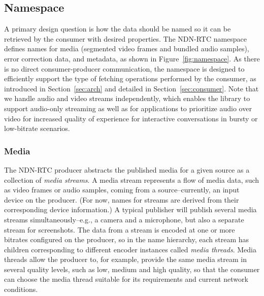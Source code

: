 \documentclass{icn/sig-alternate-2013} %
\newcommand{\ndnrtcName}{NDN-RTC} %
\begin{document}
\subsection{Namespace}

A primary design question is how the data should be named so it can be retrieved by the consumer with desired properties. The \ndnrtcName{} namespace defines names for media (segmented video frames and bundled audio samples), error correction data, and metadata, as shown in Figure~\ref{fig:namespace}.  As there is no direct consumer-producer communication, the namespace is designed to efficiently support the type of fetching operations performed by the consumer, as introduced in Section~\ref{sec:arch} and detailed in Section~\ref{sec:consumer}.   Note that we handle audio and video streams independently, which enables the library to support audio-only streaming as well as for applications to prioritize audio over video for increased quality of experience for interactive conversations in bursty or low-bitrate scenarios.  

\subsubsection{Media} 

The \ndnrtcName{} producer abstracts the published media for a given source as a collection of \textit{media streams}. A media stream represents a flow of media data, such as video frames or audio samples, coming from a source--currently, an input device on the producer. (For now, names for streams are derived from their corresponding device information.) A typical publisher will publish several media streams simultaneously--e.g., a camera and a microphone, but also a separate stream for screenshots.  The data from a stream is encoded at one or more bitrates configured on the producer, so in the name hierarchy, each stream has children corresponding to different encoder instances called \textit{media threads}. Media threads allow the producer to, for example, provide the same media stream in several quality levels, such as low, medium and high quality, so that the consumer can choose the media thread suitable for its requirements and current network conditions.
\end{document}
